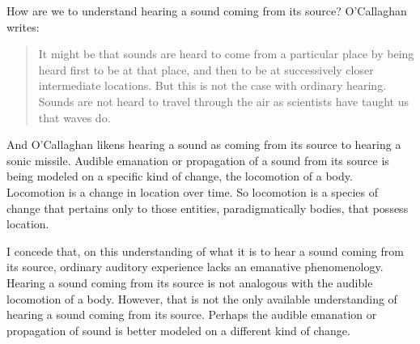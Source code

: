 How are we to understand hearing a sound coming from its source? O'Callaghan writes:
\begin{quote}
	It might be that sounds are heard to come from a particular place by being heard first to be at that place, and then to be at successively closer intermediate locations. But this is not the case with ordinary hearing. Sounds are not heard to travel through the air as scientists have taught us that waves do. \citep[34]{OCallaghan:2007xy}
\end{quote}
And O'Callaghan likens hearing a sound as coming from its source to hearing a sonic missile. Audible emanation or propagation of a sound from its source is being modeled on a specific kind of change, the locomotion of a body. Locomotion is a change in location over time. So locomotion is a species of change that pertains only to those entities, paradigmatically bodies, that possess location. 

I concede that, on this understanding of what it is to hear a sound coming from its source, ordinary auditory experience lacks an emanative phenomenology. Hearing a sound coming from its source is not analogous with the audible locomotion of a body. However, that is not the only available understanding of hearing a sound coming from its source. Perhaps the audible emanation or propagation of sound is better modeled on a different kind of change. 

